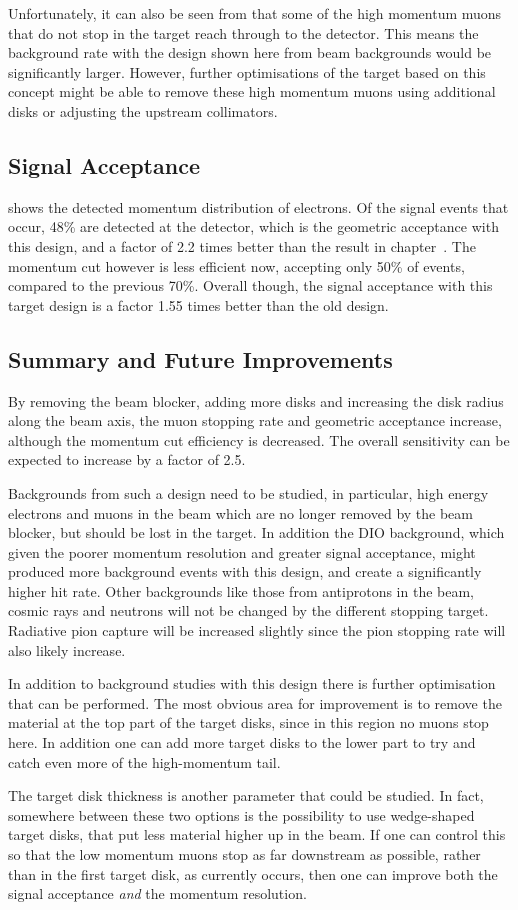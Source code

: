 Unfortunately, it can also be seen from  that some of the high momentum muons that do not stop in the target reach through to the detector.
This means the background rate with the design shown here from beam backgrounds would be significantly larger.
However, further optimisations of the target based on this concept might be able to remove these high momentum muons using additional disks or adjusting the upstream collimators.

\subsection{Signal Acceptance}
 shows the detected momentum distribution of electrons.
Of the signal events that occur, 48\% are detected at the detector, which is the geometric acceptance with this design, and a factor of 2.2 times better than the result in chapter~.
The momentum cut however is less efficient now, accepting only 50\% of events, compared to the previous 70\%.  
Overall though, the signal acceptance with this target design is a factor 1.55 times better than the old design.

\subsection{Summary and Future Improvements}
By removing the beam blocker, adding more disks and increasing the disk radius along the beam axis, the muon stopping rate and geometric acceptance increase, although the momentum cut efficiency is decreased.
The overall sensitivity can be expected to increase by a factor of 2.5.

Backgrounds from such a design need to be studied, in particular, high energy electrons and muons in the beam which are no longer removed by the beam blocker, but should be lost in the target.
In addition the \ac{DIO} background, which given the poorer momentum resolution and greater signal acceptance, might produced more background events with this design, and create a significantly higher hit rate.
Other backgrounds like those from antiprotons in the beam, cosmic rays and neutrons will not be changed by the different stopping target.
Radiative pion capture will be increased slightly since the pion stopping rate will also likely increase.

In addition to background studies with this design there is further optimisation that can be performed.
The most obvious area for improvement is to remove the material at the top part of the target disks, since in this region no muons stop here.
In addition one can add more target disks to the lower part to try and catch even more of the high-momentum tail.

The target disk thickness is another parameter that could be studied.
In fact, somewhere between these two options is the possibility to use wedge-shaped target disks, that put less material higher up in the beam.
If one can control this so that the low momentum muons stop as far downstream as possible, rather than in the first target disk, as currently occurs, then one can improve both the signal acceptance \emph{and} the momentum resolution.
